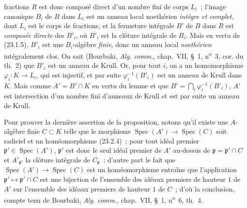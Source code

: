 \documentclass[10pt,oneside]{book}
\begin{document}
fractions $R$ est donc composé direct d'un nombre fini de corps $L_i$~;
l'image canonique $B_i$ de $B$ dans $L_i$ est un anneau local noethérien
\emph{intègre et complet}, dont $L_i$ est le corps de fractions, et la
fermeture intégrale $B'$ de $B$ dans $R$ est \emph{composée directe} des
$B'_i$, où $B'_i$ est la clôture intégrale de $B_i$. Mais en vertu de
(23.1.5), $B'_i$ est une $B_i$-algèbre \emph{finie}, donc un anneau local
\emph{noethérien} intégralement clos. On sait (Bourbaki,
\emph{Alg. comm.}, chap.~VII, §~1, n\textsuperscript{o}~3, cor. du th.~2) que
$B'_i$ est un anneau de Krull. Or, pour tout $i$, on a un homomorphisme
$\varphi_i:K\to L_i$, qui est injectif, et par suite
$\varphi_i^{-1}(B'_i)$ est un anneau de Krull dans $K$. Mais comme
$A'=B'\cap K$ en vertu du lemme et que
$B'=\bigcap_i\varphi_i^{-1}(B'_i)$, $A'$ est intersection d'un nombre fini
d'anneaux de Krull et est par suite un anneau de Krull.

Pour prouver la dernière assertion de la proposition, notons qu'il existe une
$A$-algèbre finie $C\subset K$ telle que le morphisme
$\operatorname{Spec}(A')\to\operatorname{Spec}(C)$ soit radiciel et un
homéomorphisme (23.2.4)~; pour tout idéal premier
$\mathfrak p'\in\operatorname{Spec}(A')$, $\mathfrak p'$ est donc le seul
idéal premier de $A'$ au-dessus de $\mathfrak p=\mathfrak p'\cap C$ et
$A'_{\mathfrak p'}$ la clôture intégrale de $C_{\mathfrak p}$~; d'autre part
le fait que $\operatorname{Spec}(A')\to\operatorname{Spec}(C)$ est un
homéomorphisme entraîne que l'application
$\mathfrak p'\mapsto\mathfrak p'\cap C$ est une bijection de l'ensemble des
idéaux premiers de hauteur $1$ de $A'$ sur l'ensemble des idéaux premiers de
hauteur $1$ de $C$~; d'où la conclusion, compte tenu de Bourbaki,
\emph{Alg. comm.}, chap.~VII, §~1, n\textsuperscript{o}~6, th.~4.
\end{document}
